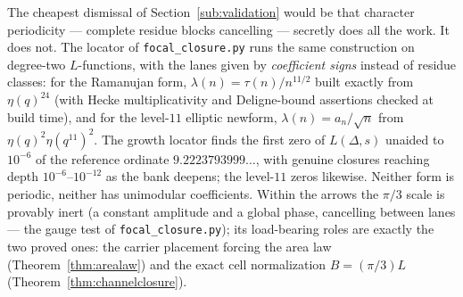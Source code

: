 \documentclass[11pt]{article}
\newcommand{\code}[1]{\texttt{#1}}
\begin{document}
The cheapest dismissal of Section~\ref{sub:validation} would be that character periodicity ---
complete residue blocks cancelling --- secretly does all the work.  It does not.  The locator of
\code{focal\_closure.py} runs the same construction on degree-two $L$-functions, with the lanes
given by \emph{coefficient signs} instead of residue classes: for the Ramanujan form,
$\lambda(n)=\tau(n)/n^{11/2}$ built exactly from $\eta(q)^{24}$ (with Hecke multiplicativity and
Deligne-bound assertions checked at build time), and for the level-$11$ elliptic newform,
$\lambda(n)=a_n/\sqrt n$ from $\eta(q)^2\eta(q^{11})^2$.  The growth locator finds the first zero of
$L(\Delta,s)$ unaided to $10^{-6}$ of the reference ordinate $9.2223793999\ldots$, with genuine
closures reaching depth $10^{-6}$--$10^{-12}$ as the bank deepens; the level-$11$ zeros likewise.
Neither form is periodic, neither has unimodular coefficients.  Within the arrows the $\pi/3$ scale
is provably inert (a constant amplitude and a global phase, cancelling between lanes --- the gauge
test of \code{focal\_closure.py}); its load-bearing roles are exactly the two proved ones: the
carrier placement forcing the area law (Theorem~\ref{thm:arealaw}) and the exact cell normalization
$B=(\pi/3)L$ (Theorem~\ref{thm:channelclosure}).
\end{document}
